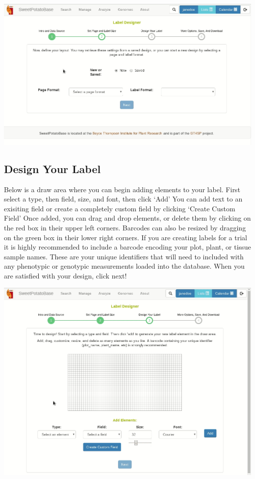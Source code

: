 \documentclass[
  12pt,
]{book}
\begin{document}
\begin{center}\includegraphics[width=0.95\linewidth]{assets/gifs/gif2} \end{center}

\hypertarget{design-your-label}{%
\subsection{Design Your Label}\label{design-your-label}}

Below is a draw area where you can begin adding elements to your label. First select a type, then field, size, and font, then click `Add' You can add text to an exisiting field or create a completely custom field by clicking `Create Custom Field' Once added, you can drag and drop elements, or delete them by clicking on the red box in their upper left corners. Barcodes can also be resized by dragging on the green box in their lower right corners. If you are creating labels for a trial it is highly recommended to include a barcode encoding your plot, plant, or tissue sample names. These are your unique identifiers that will need to included with any phenotypic or genotypic measurements loaded into the database. When you are satisfied with your design, click next!

\begin{center}\includegraphics[width=0.95\linewidth]{assets/gifs/gif3} \end{center}
\end{document}
